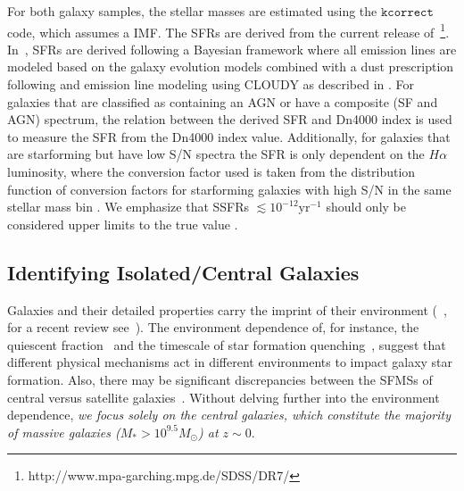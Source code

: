 \documentclass[preprint2,tighten]{aastex62}
\begin{document}
For both galaxy samples, the stellar masses are estimated using the 
\citet{blanton2007} $\mathtt{kcorrect}$ code, which assumes a 
\citep{chabrier2003} IMF. The SFRs are derived from the 
current release of~\citet{brinchmann2004}\footnote{http://www.mpa-garching.mpg.de/SDSS/DR7/}. 
In~\citet{brinchmann2004}, SFRs 
are derived following a Bayesian framework where all emission lines are modeled based on the \citet{bruzualCharlot1993, bruzualCharlot1993} galaxy evolution models combined with a dust prescription following \citet{charlotFall2000} and emission line modeling using CLOUDY \citep[version C90.04][]{ferland1996} as described in \citet{charlotLonghetti2001, charlot2002}. For galaxies that are classified as containing an AGN or have a composite (SF and AGN) spectrum, the relation between the derived SFR and Dn4000 index \citep[implemented following][]{Balogh1998} is used to measure the SFR from the Dn4000 index value. Additionally, for galaxies that are starforming but have low S/N spectra the SFR is only dependent on the $H{\alpha}$ luminosity, where the conversion factor used is taken from the distribution function of conversion factors for starforming galaxies with high S/N in the same stellar mass bin \citep{brinchmann2004}. 
We emphasize that SSFRs $\lesssim 10^{-12} \mathrm{yr}^{-1}$ should only be 
considered upper limits to the true value \citep{salim2007}.

\subsection{Identifying Isolated/Central Galaxies} \label{sec:central}
Galaxies and their detailed properties carry the 
imprint of their environment (~\citealt{hubble1936, oemler1974, dressler1980, guzzo1997}, 
for a recent review see~\citealp{blanton2009}). The environment
dependence of, for instance, the quiescent 
fraction~\citep[\emph{e.g.}][]{baldry2006,peng2010,hahn2015}
and the timescale of star formation quenching~\citep{wetzel2013,hahn2017}, 
suggest that different physical mechanisms act in different environments 
to impact galaxy star formation. Also, there may be significant 
discrepancies between the SFMSs of central versus satellite 
galaxies~\citep{wang2018}. Without delving further into the 
environment dependence, \emph{we focus solely on the central galaxies, 
which constitute the majority of massive galaxies ($M_* > 10^{9.5}M_\odot$) 
at $z \sim 0$}. 
\end{document}
